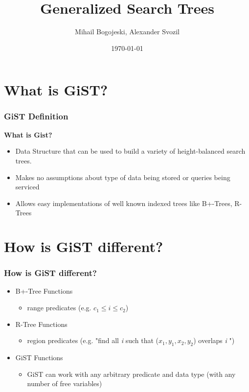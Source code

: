 \documentclass{beamer}
\title{Generalized Search Trees}
\author{Mihail Bogojeski, Alexander Svozil}
\date{\today}
\begin{document}
\maketitle
\frame{\tableofcontents[currentsection]}
 
\section {What is GiST?}
\begin{frame}%
  \frametitle{GiST Definition} %
  \textbf {What is Gist?}
  \begin {itemize}
  \item Data Structure that can be used to build a variety of height-balanced search trees.
  \pause \item Makes no assumptions about type of data being stored or queries being serviced
  \pause \item Allows easy implementations of well known indexed trees like B+-Trees, R-Trees
  \end {itemize}
\end{frame}

\section {How is GiST different?}
\begin{frame}%
  \frametitle{How is GiST different?} %
  
  \begin {itemize}
  \item  B+-Tree Functions 
  \begin {itemize}
    \item range predicates (e.g. $c_1 \leq i \leq c_2$)
  \end {itemize}
  \pause \item R-Tree Functions 
  \begin {itemize}
    \item region predicates (e.g. "find all \emph{i} such that  ($x_1,y_1,x_2,y_2$) overlaps \emph{i} ")
  \end {itemize} 
  \pause \item GiST Functions
  \begin {itemize}
    \item GiST can work with any arbitrary predicate and data type (with any number of free variables)
  \end {itemize} 
  
  \end {itemize}
\end{frame}
\end{document}
